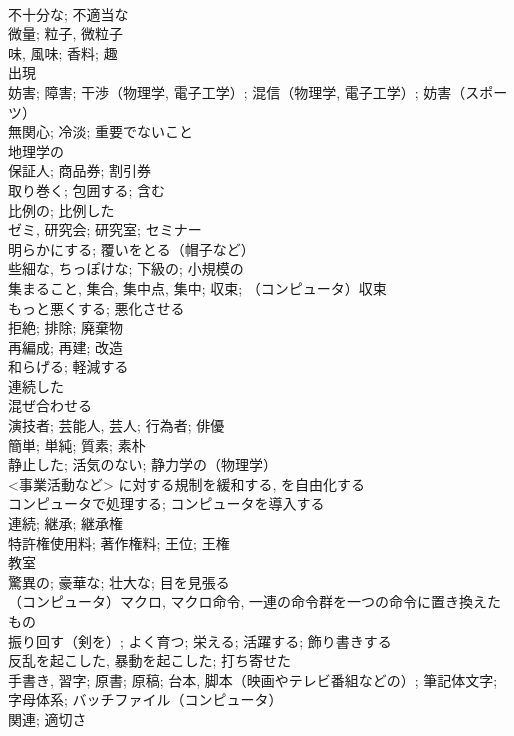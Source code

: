 \documentclass[8pt]{extreport}
\begin{document}
\begin{CJK}{UTF8}{min}
\\	不十分な; 不適当な	
\\	微量; 粒子, 微粒子	
\\	味, 風味; 香料; 趣	
\\	出現	
\\	妨害; 障害; 干渉（物理学, 電子工学）; 混信（物理学, 電子工学）; 妨害（スポーツ）	
\\	無関心; 冷淡; 重要でないこと	
\\	地理学の	
\\	保証人; 商品券; 割引券	
\\	取り巻く; 包囲する; 含む	
\\	比例の; 比例した	
\\	ゼミ, 研究会; 研究室; セミナー	
\\	明らかにする; 覆いをとる（帽子など）	
\\	些細な, ちっぽけな; 下級の; 小規模の	
\\	集まること, 集合, 集中点, 集中; 収束; （コンピュータ）収束	
\\	もっと悪くする; 悪化させる	
\\	拒絶; 排除; 廃棄物	
\\	再編成; 再建; 改造
\\	和らげる; 軽減する	
\\	連続した	
\\	混ぜ合わせる	
\\	演技者; 芸能人, 芸人; 行為者; 俳優	
\\	簡単; 単純; 質素; 素朴	
\\	静止した; 活気のない; 静力学の（物理学）	
\\	<事業活動など> に対する規制を緩和する, を自由化する	
\\	コンピュータで処理する; コンピュータを導入する	
\\	連続; 継承; 継承権	
\\	特許権使用料; 著作権料; 王位; 王権	
\\	教室	
\\	驚異の; 豪華な; 壮大な; 目を見張る	
\\	（コンピュータ）マクロ, マクロ命令, 一連の命令群を一つの命令に置き換えたもの	
\\	振り回す（剣を）; よく育つ; 栄える; 活躍する; 飾り書きする	
\\	反乱を起こした, 暴動を起こした; 打ち寄せた	
\\	手書き, 習字; 原書; 原稿; 台本, 脚本（映画やテレビ番組などの）; 筆記体文字; 字母体系; バッチファイル（コンピュータ）	
\\	関連; 適切さ	

\end{CJK}
\end{document}
